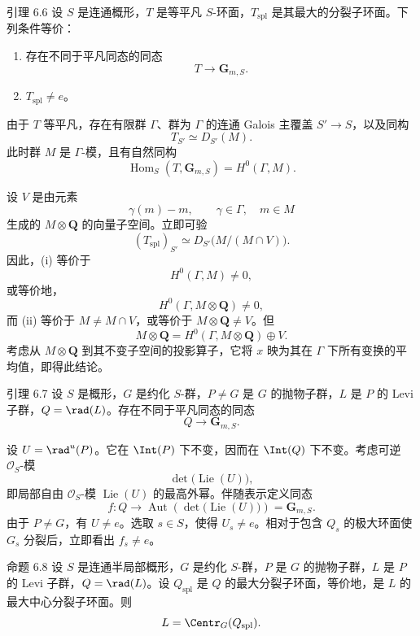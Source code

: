 \begin{sgastatement}{引理 6.6}
设 \(S\) 是连通概形，\(T\) 是等平凡 \(S\)-环面，\(T_{\mathrm{spl}}\) 是其最大的分裂子环面。下列条件等价：
\begin{enumerate}[label=\textup{(\roman*)}]
\item 存在不同于平凡同态的同态
\[
 T\longrightarrow\mathbf G_{m,S}.
\]
\item \(T_{\mathrm{spl}}\ne e\)。
\end{enumerate}
\end{sgastatement}

由于 \(T\) 等平凡，存在有限群 \(\Gamma\)、群为 \(\Gamma\) 的连通 Galois 主覆盖 \(S'\to S\)，以及同构
\[
 T_{S'}\simeq D_{S'}(M).
\]
此时群 \(M\) 是 \(\Gamma\)-模，且有自然同构
\[
 \operatorname{Hom}_S(T,\mathbf G_{m,S})
   =H^0(\Gamma,M).
\]

设 \(V\) 是由元素
\[
 \gamma(m)-m,\qquad \gamma\in\Gamma,\quad m\in M
\]
生成的 \(M\otimes\mathbf Q\) 的向量子空间。立即可验
\[
 (T_{\mathrm{spl}})_{S'}
   \simeq D_{S'}\bigl(M/(M\cap V)\bigr).
\]
因此，\textup{(i)} 等价于
\[
 H^0(\Gamma,M)\ne0,
\]
或等价地，
\[
 H^0(\Gamma,M\otimes\mathbf Q)\ne0,
\]
而 \textup{(ii)} 等价于 \(M\ne M\cap V\)，或等价于 \(M\otimes\mathbf Q\ne V\)。但
\[
 M\otimes\mathbf Q
 =H^0(\Gamma,M\otimes\mathbf Q)\oplus V.
\]
考虑从 \(M\otimes\mathbf Q\) 到其不变子空间的投影算子，它将 \(x\) 映为其在 \(\Gamma\) 下所有变换的平均值，即得此结论。

\begin{sgastatement}{引理 6.7}
设 \(S\) 是概形，\(G\) 是约化 \(S\)-群，\(P\ne G\) 是 \(G\) 的抛物子群，\(L\) 是 \(P\) 的 Levi 子群，\(Q=\rad(L)\)。存在不同于平凡同态的同态
\[
 Q\longrightarrow\mathbf G_{m,S}.
\]
\end{sgastatement}

设 \(U=\rad^u(P)\)。它在 \(\Int(P)\) 下不变，因而在 \(\Int(Q)\) 下不变。考虑可逆 \(\mathcal O_S\)-模
\[
 \det\bigl(\operatorname{Lie}(U)\bigr),
\]
即局部自由 \(\mathcal O_S\)-模 \(\operatorname{Lie}(U)\) 的最高外幂。伴随表示定义同态
\[
 f:Q\longrightarrow
 \operatorname{Aut}\!\left(\det\bigl(\operatorname{Lie}(U)\bigr)\right)
 =\mathbf G_{m,S}.
\]
由于 \(P\ne G\)，有 \(U\ne e\)。选取 \(s\in S\)，使得 \(U_s\ne e\)。相对于包含 \(Q_s\) 的极大环面使 \(G_s\) 分裂后，立即看出 \(f_s\ne e\)。

\begin{sgastatement}{命题 6.8}
设 \(S\) 是连通半局部概形，\(G\) 是约化 \(S\)-群，\(P\) 是 \(G\) 的抛物子群，\(L\) 是 \(P\) 的 Levi 子群，\(Q=\rad(L)\)。设 \(Q_{\mathrm{spl}}\) 是 \(Q\) 的最大分裂子环面，等价地，是 \(L\) 的最大中心分裂子环面。则
\[
 L=\Centr_G(Q_{\mathrm{spl}}).
\]
\end{sgastatement}


